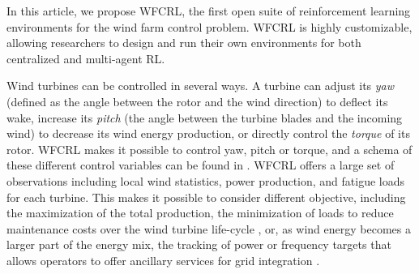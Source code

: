 \documentclass{article}
\begin{document}
In this article, we propose WFCRL, the first open suite of reinforcement learning environments for the wind farm control problem. WFCRL is highly customizable, allowing researchers to design and run their own environments for both centralized and multi-agent RL. 


Wind turbines can be controlled in several ways. A turbine can adjust its \textit{yaw} (defined as the angle between the rotor and the wind direction) to deflect its wake, increase its \textit{pitch} (the angle between the turbine blades and the incoming wind) to decrease its wind energy production, or directly control the \textit{torque} of its rotor. WFCRL makes it possible to control yaw, pitch or torque, and a schema of these different control variables can be found in . WFCRL offers a large set of observations including local wind statistics, power production, and fatigue loads for each turbine.
This makes it possible to consider different objective, including the maximization of the total production, the minimization of loads to reduce maintenance costs over the wind turbine life-cycle \cite{wfc-quant-review}, or, as wind energy becomes a larger part of the energy mix, the tracking of power or frequency targets that allows operators to offer ancillary services for grid integration \cite{miller2010advanced}. 
\end{document}
